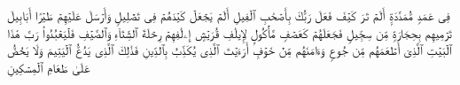 \stopbuffer
\startbuffer[\q:104:9]
فِی عَمَدࣲ مُّمَدَّدَةِۭ%
\stopbuffer
\startbuffer[\q:105:1]
أَلَمۡ تَرَ كَیۡفَ فَعَلَ رَبُّكَ بِأَصۡحَٰبِ ٱلۡفِیلِ%
\stopbuffer
\startbuffer[\q:105:2]
أَلَمۡ یَجۡعَلۡ كَیۡدَهُمۡ فِی تَضۡلِیلࣲ%
\stopbuffer
\startbuffer[\q:105:3]
وَأَرۡسَلَ عَلَیۡهِمۡ طَیۡرًا أَبَابِیلَ%
\stopbuffer
\startbuffer[\q:105:4]
تَرۡمِیهِم بِحِجَارَةࣲ مِّن سِجِّیلࣲ%
\stopbuffer
\startbuffer[\q:105:5]
فَجَعَلَهُمۡ كَعَصۡفࣲ مَّأۡكُولِۭ%
\stopbuffer
\startbuffer[\q:106:1]
لِإِیلَٰفِ قُرَیۡشٍ%
\stopbuffer
\startbuffer[\q:106:2]
إِۦلَٰفِهِمۡ رِحۡلَةَ ٱلشِّتَاۤءِ وَٱلصَّیۡفِ%
\stopbuffer
\startbuffer[\q:106:3]
فَلۡیَعۡبُدُوا۟ رَبَّ هَٰذَا ٱلۡبَیۡتِ%
\stopbuffer
\startbuffer[\q:106:4]
ٱلَّذِیۤ أَطۡعَمَهُم مِّن جُوعࣲ وَءَامَنَهُم مِّنۡ خَوۡفِۭ%
\stopbuffer
\startbuffer[\q:107:1]
أَرَءَیۡتَ ٱلَّذِی یُكَذِّبُ بِٱلدِّینِ%
\stopbuffer
\startbuffer[\q:107:2]
فَذَٰلِكَ ٱلَّذِی یَدُعُّ ٱلۡیَتِیمَ%
\stopbuffer
\startbuffer[\q:107:3]
وَلَا یَحُضُّ عَلَىٰ طَعَامِ ٱلۡمِسۡكِینِ%
\stopbuffer
